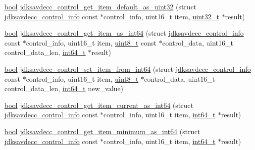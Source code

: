 \begin{DoxyCompactItemize}
\hyperlink{avb__gptp_8h_af6a258d8f3ee5206d682d799316314b1}{bool} \hyperlink{group__aem__control__value__helpers_ga847c6d130c3033ffa0514860f343326a}{jdksavdecc\+\_\+control\+\_\+get\+\_\+item\+\_\+default\+\_\+as\+\_\+uint32} (struct \hyperlink{structjdksavdecc__control__info}{jdksavdecc\+\_\+control\+\_\+info} const $\ast$control\+\_\+info, uint16\+\_\+t item, \hyperlink{parse_8c_a6eb1e68cc391dd753bc8ce896dbb8315}{uint32\+\_\+t} $\ast$result)
\item 
\hyperlink{avb__gptp_8h_af6a258d8f3ee5206d682d799316314b1}{bool} \hyperlink{group__aem__control__value__helpers_ga4898e762da8aca74353348081dcb51ea}{jdksavdecc\+\_\+control\+\_\+get\+\_\+item\+\_\+as\+\_\+int64} (struct \hyperlink{structjdksavdecc__control__info}{jdksavdecc\+\_\+control\+\_\+info} const $\ast$control\+\_\+info, uint16\+\_\+t item, \hyperlink{stdint_8h_aba7bc1797add20fe3efdf37ced1182c5}{uint8\+\_\+t} const $\ast$control\+\_\+data, uint16\+\_\+t control\+\_\+data\+\_\+len, \hyperlink{parse_8c_a67a9885ef4908cb72ce26d75b694386c}{int64\+\_\+t} $\ast$result)
\item 
\hyperlink{avb__gptp_8h_af6a258d8f3ee5206d682d799316314b1}{bool} \hyperlink{group__aem__control__value__helpers_gad81dafd02179fe09eb719c9d0d014511}{jdksavdecc\+\_\+control\+\_\+set\+\_\+item\+\_\+from\+\_\+int64} (struct \hyperlink{structjdksavdecc__control__info}{jdksavdecc\+\_\+control\+\_\+info} const $\ast$control\+\_\+info, uint16\+\_\+t item, \hyperlink{stdint_8h_aba7bc1797add20fe3efdf37ced1182c5}{uint8\+\_\+t} $\ast$control\+\_\+data, uint16\+\_\+t control\+\_\+data\+\_\+len, \hyperlink{parse_8c_a67a9885ef4908cb72ce26d75b694386c}{int64\+\_\+t} new\+\_\+value)
\item 
\hyperlink{avb__gptp_8h_af6a258d8f3ee5206d682d799316314b1}{bool} \hyperlink{group__aem__control__value__helpers_ga9a2d9c6b813f6e5178b9d261a82c0cba}{jdksavdecc\+\_\+control\+\_\+get\+\_\+item\+\_\+current\+\_\+as\+\_\+int64} (struct \hyperlink{structjdksavdecc__control__info}{jdksavdecc\+\_\+control\+\_\+info} const $\ast$control\+\_\+info, uint16\+\_\+t item, \hyperlink{parse_8c_a67a9885ef4908cb72ce26d75b694386c}{int64\+\_\+t} $\ast$result)
\item 
\hyperlink{avb__gptp_8h_af6a258d8f3ee5206d682d799316314b1}{bool} \hyperlink{group__aem__control__value__helpers_ga71a265af6ca984dcbea5458b013e107c}{jdksavdecc\+\_\+control\+\_\+get\+\_\+item\+\_\+minimum\+\_\+as\+\_\+int64} (struct \hyperlink{structjdksavdecc__control__info}{jdksavdecc\+\_\+control\+\_\+info} const $\ast$control\+\_\+info, uint16\+\_\+t item, \hyperlink{parse_8c_a67a9885ef4908cb72ce26d75b694386c}{int64\+\_\+t} $\ast$result)

\end{DoxyCompactItemize}
